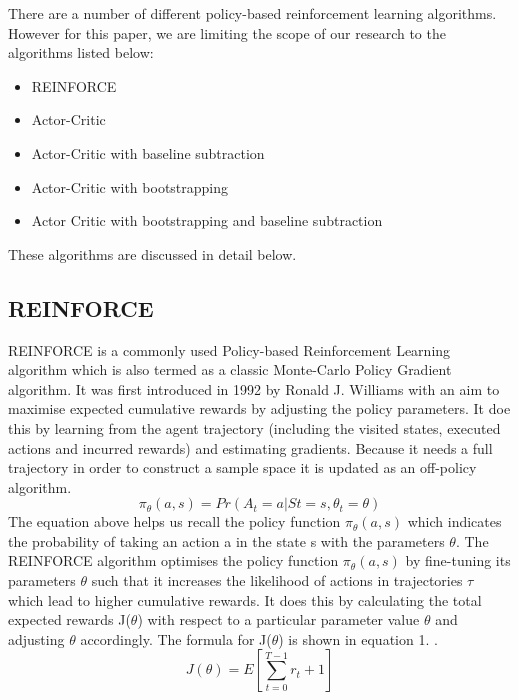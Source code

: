 \documentclass{article}
\begin{document}
There are a number of different policy-based reinforcement learning algorithms. However for this paper, we are limiting the scope of our research to the algorithms listed below: 

\begin{itemize}
\item REINFORCE
\item Actor-Critic
\item Actor-Critic with baseline subtraction
\item Actor-Critic with bootstrapping
\item Actor Critic with bootstrapping and baseline subtraction
\end{itemize}
These algorithms are discussed in detail below. 

\subsection{REINFORCE}
\quad REINFORCE is a commonly used Policy-based Reinforcement Learning algorithm which is also termed as a classic Monte-Carlo Policy Gradient algorithm. It was first introduced in 1992 by Ronald J. Williams with an aim to maximise expected cumulative rewards by adjusting the policy parameters. It doe this by learning from the agent trajectory (including the visited states, executed actions and incurred rewards) and estimating gradients. Because it needs a full trajectory in order to construct a sample space it is updated as an off-policy algorithm. \newline
\begin{equation}
\pi_\theta(a, s) = Pr(A_t = a | St = s, \theta_t = \theta)
\end{equation}
The equation above helps us recall the policy function $\pi_{\theta}(a, s)$ which indicates the probability of taking an action a in the state s with the parameters $\theta$. \newline
The REINFORCE algorithm optimises the policy function $\pi_{\theta}(a,s)$ by fine-tuning its parameters $\theta$ such that it increases the likelihood of actions in trajectories $\tau$ which lead to higher cumulative rewards. It does this by calculating the total expected rewards J($\theta$) with respect to a particular parameter value $\theta$ and adjusting $\theta$ accordingly. The formula for J($\theta$) is shown in equation 1.  \newline
. 
\begin{equation}
J(\theta) = E[ \sum_{t=0}^{T-1}r_t + 1] 
\end{equation}
\end{document}
